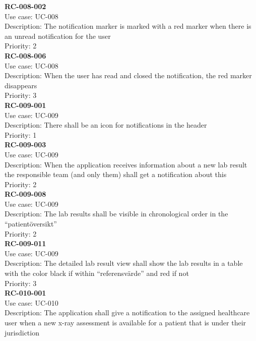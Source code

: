 \newline
\textbf{RC-008-002} \\
Use case: UC-008 \\
Description: The notification marker is marked with a red marker when there is an unread notification for the user \\
Priority: 2 \\
\newline
\textbf{RC-008-006} \\
Use case: UC-008 \\
Description: When the user has read and closed the notification, the red marker disappears \\
Priority: 3 \\
\newline
\textbf{RC-009-001} \\
Use case: UC-009 \\
Description: There shall be an icon for notifications in the header \\
Priority: 1 \\
\newline
\textbf{RC-009-003} \\
Use case: UC-009 \\
Description: When the application receives information about a new lab result the responsible team (and only them) shall get a notification about this\\
Priority: 2 \\
\newline
\textbf{RC-009-008} \\
Use case: UC-009 \\
Description: The lab results shall be visible in chronological order in the “patientöversikt” \\
Priority: 2 \\
\newline
\textbf{RC-009-011} \\
Use case: UC-009 \\
Description: The detailed lab result view shall show the lab results in a table with the color black if within “referensvärde” and red if not \\
Priority: 3 \\
\newline
\textbf{RC-010-001} \\
Use case: UC-010 \\
Description: The application shall give a notification to the assigned healthcare user when a new x-ray assessment is available for a patient that is under their jurisdiction \\
